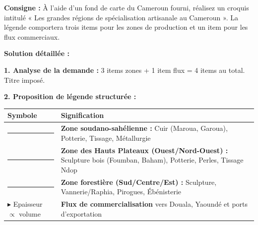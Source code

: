 \documentclass[11pt]{article}
\begin{document}
\begin{exoresolu}
\textbf{Consigne :} À l'aide d'un fond de carte du Cameroun fourni, réalisez un croquis intitulé « Les grandes régions de spécialisation artisanale au Cameroun ». La légende comportera trois items pour les zones de production et un item pour les flux commerciaux.

\tcblower
\textbf{Solution détaillée :}

\textbf{1. Analyse de la demande :} 3 items zones + 1 item flux = 4 items au total. Titre imposé.

\textbf{2. Proposition de légende structurée :}
\begin{center}
\begin{tabularx}{\linewidth}{|l|X|}\hline
\textbf{Symbole} & \textbf{Signification} \\ \hline
\cellcolor{poporangeL}\rule{1cm}{4pt} & \textbf{Zone soudano-sahélienne :} Cuir (Maroua, Garoua), Potterie, Tissage, Métallurgie \\ \hline
\cellcolor{popgreenL}\rule{1cm}{4pt} & \textbf{Zone des Hauts Plateaux (Ouest/Nord-Ouest) :} Sculpture bois (Foumban, Baham), Potterie, Perles, Tissage Ndop \\ \hline
\cellcolor{popblueL}\rule{1cm}{4pt} & \textbf{Zone forestière (Sud/Centre/Est) :} Sculpture, Vannerie/Raphia, Pirogues, Ébénisterie \\ \hline
$\blacktriangleright$ \textcolor{popdark}{Epaisseur $\propto$ volume} & \textbf{Flux de commercialisation} vers Douala, Yaoundé et ports d'exportation \\ \hline
\end{tabularx}
\end{center}


\end{exoresolu}
\end{document}

